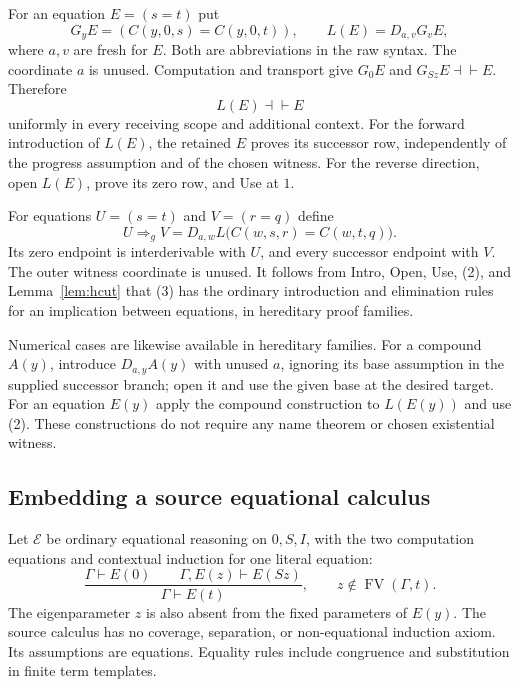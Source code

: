 \documentclass[11pt]{article}
\theoremstyle{definition}\newtheorem{definition}[theorem]{Definition}
\theoremstyle{remark}\newtheorem{remark}[theorem]{Remark}
\newcommand{\EE}{\mathcal E}
\newcommand{\FV}{\operatorname{FV}}
\begin{document}
For an equation $E=(s=t)$ put
\[
 G_yE=(C(y,0,s)=C(y,0,t)),\qquad
 L(E)=D_{a,v}G_vE,
\]
where $a,v$ are fresh for $E$. Both are abbreviations in the raw syntax.
The coordinate $a$ is unused. Computation and transport give
$G_0E$ and $G_{Sz}E\dashv\vdash E$. Therefore
\[
 L(E)\dashv\vdash E                                      \tag{2}
\]
uniformly in every receiving scope and additional context. For the
forward introduction of $L(E)$, the retained $E$ proves its successor
row, independently of the progress assumption and of the chosen witness.
For the reverse direction, open $L(E)$, prove its zero row, and Use at $1$.

For equations $U=(s=t)$ and $V=(r=q)$ define
\[
 U\Rightarrow_g V
 =D_{a,w}L\bigl(C(w,s,r)=C(w,t,q)\bigr).                  \tag{3}
\]
Its zero endpoint is interderivable with $U$, and every successor
endpoint with $V$. The outer witness coordinate is unused. It follows
from Intro, Open, Use, (2), and Lemma~\ref{lem:hcut} that (3) has the
ordinary introduction and elimination rules for an implication between
equations, in hereditary proof families.

Numerical cases are likewise available in hereditary families. For a
compound $A(y)$, introduce $D_{a,y}A(y)$ with unused $a$, ignoring its
base assumption in the supplied successor branch; open it and use the
given base at the desired target. For an equation $E(y)$ apply the
compound construction to $L(E(y))$ and use (2). These constructions do
not require any name theorem or chosen existential witness.

\subsection{Embedding a source equational calculus}

Let $\EE$ be ordinary equational reasoning on $0,S,I$, with the two
computation equations and contextual induction for one literal equation:
\[
 \frac{\Gamma\vdash E(0)\qquad\Gamma,E(z)\vdash E(Sz)}
      {\Gamma\vdash E(t)},
 \qquad z\notin\FV(\Gamma,t).
                                                               \tag{EI}
\]
The eigenparameter $z$ is also absent from the fixed parameters of $E(y)$.
The source calculus has no coverage, separation, or non-equational induction axiom.
Its assumptions are equations. Equality rules include congruence and
substitution in finite term templates.
\end{document}
